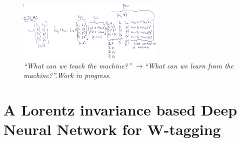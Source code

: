 \begin{centering}
\begin{figure}[b!] 
    \centering
    \includegraphics[width=7.1cm]{figures/vtagging/misc/cola.png}
    \vspace*{5mm}
    \caption*{\footnotesize{\textit{ ``What can we teach the machine?'' $\rightarrow$``What can we learn from the machine?''.\newline Work in progress.}}}
\end{figure}
\end{centering}
\clearpage
\chapter{A Lorentz invariance based Deep Neural Network for W-tagging}
